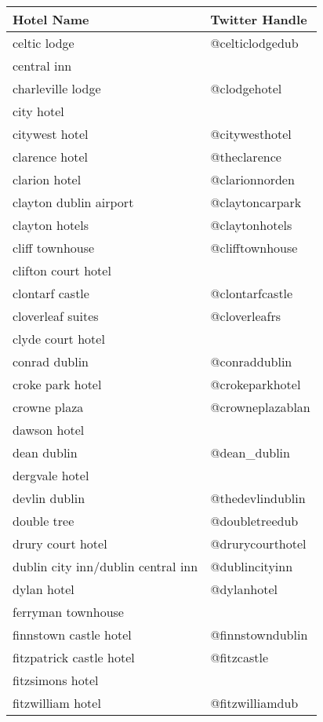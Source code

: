 \begin{table}[h!]
\begin{tabular}{|p{7cm}|p{5cm}|}
\hline
\textbf{Hotel Name} & \textbf{Twitter Handle} \\ \hline
celtic lodge & @celticlodgedub \\ \hline
central inn &  \\ \hline
charleville lodge & @clodgehotel \\ \hline
city hotel &  \\ \hline
citywest hotel & @citywesthotel \\ \hline
clarence hotel & @theclarence \\ \hline
clarion hotel & @clarionnorden \\ \hline
clayton dublin airport & @claytoncarpark \\ \hline
clayton hotels & @claytonhotels \\ \hline
cliff townhouse & @clifftownhouse \\ \hline
clifton court hotel &  \\ \hline
clontarf castle & @clontarfcastle \\ \hline
cloverleaf suites & @cloverleafrs \\ \hline
clyde court hotel &  \\ \hline
conrad dublin & @conraddublin \\ \hline
croke park hotel & @crokeparkhotel \\ \hline
crowne plaza & @crowneplazablan \\ \hline
dawson hotel &  \\ \hline
dean dublin & @dean\_dublin \\ \hline
dergvale hotel &  \\ \hline
devlin dublin & @thedevlindublin \\ \hline
double tree & @doubletreedub \\ \hline
drury court hotel & @drurycourthotel \\ \hline
dublin city inn/dublin central inn & @dublincityinn \\ \hline
dylan hotel & @dylanhotel \\ \hline
ferryman townhouse &  \\ \hline
finnstown castle hotel & @finnstowndublin \\ \hline
fitzpatrick castle hotel & @fitzcastle \\ \hline
fitzsimons hotel &  \\ \hline
fitzwilliam hotel & @fitzwilliamdub \\ \hline

\end{tabular}
\end{table}

